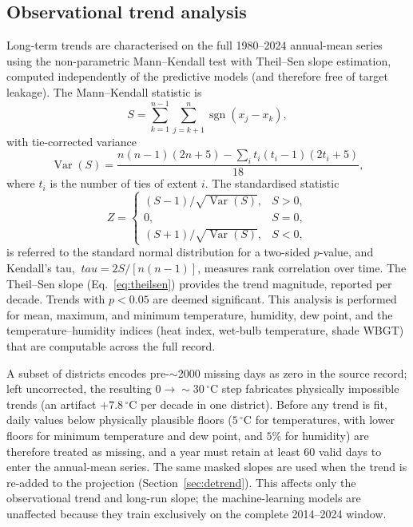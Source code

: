 \documentclass[review,11pt]{elsarticle}
\newcommand{\degC}{\ensuremath{^{\circ}\mathrm{C}}}
\begin{document}
\subsection{Observational trend analysis}\label{sec:trend}
Long-term trends are characterised on the full 1980--2024 annual-mean series
using the non-parametric Mann--Kendall test with Theil--Sen slope estimation,
computed independently of the predictive models (and therefore free of target
leakage). The Mann--Kendall statistic is
\begin{equation}
S=\sum_{k=1}^{n-1}\sum_{j=k+1}^{n}\operatorname{sgn}(x_j-x_k),
\end{equation}
with tie-corrected variance
\begin{equation}
\operatorname{Var}(S)=\frac{n(n-1)(2n+5)-\sum_{i} t_i(t_i-1)(2t_i+5)}{18},
\end{equation}
where $t_i$ is the number of ties of extent $i$. The standardised statistic
\begin{equation}
Z=\begin{cases}
(S-1)/\sqrt{\operatorname{Var}(S)}, & S>0,\\
0, & S=0,\\
(S+1)/\sqrt{\operatorname{Var}(S)}, & S<0,
\end{cases}
\end{equation}
is referred to the standard normal distribution for a two-sided $p$-value, and
Kendall's tau, $\ tau = 2S/[n(n-1)]$, measures rank correlation over time. The Theil--Sen
slope (Eq.~\ref{eq:theilsen}) provides the trend magnitude, reported per decade.
Trends with $p<0.05$ are deemed significant. This analysis is performed for mean,
maximum, and minimum temperature, humidity, dew point, and the
temperature--humidity indices (heat index, wet-bulb temperature, shade WBGT)
that are computable across the full record.

A subset of districts encodes pre-$\sim$2000 missing days as zero in the source
record; left uncorrected, the resulting $0\rightarrow\sim\!30\,\degC$ step
fabricates physically impossible trends (an artifact $+7.8\,\degC$ per decade
in one district). Before any trend is fit, daily values below physically
plausible floors ($5\,\degC$ for temperatures, with lower floors for minimum
temperature and dew point, and $5\%$ for humidity) are therefore treated as
missing, and a year must retain at least 60 valid days to enter the annual-mean
series. The same masked slopes are used when the trend is re-added to the
projection (Section~\ref{sec:detrend}). This affects only the observational
trend and long-run slope; the machine-learning models are unaffected because they
train exclusively on the complete 2014--2024 window.
\end{document}
